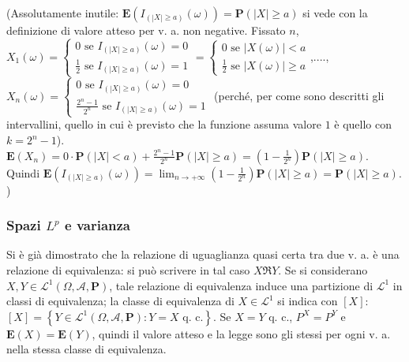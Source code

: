 \documentclass{article}
\begin{document}
(Assolutamente inutile: $\mathbf{E}\left( I_{\left( \left\vert X\right\vert
\geq a\right) }\left( \omega \right) \right) =\mathbf{P}\left( \left\vert
X\right\vert \geq a\right) $ si vede con la definizione di valore atteso per
v. a. non negative. Fissato $n$, $X_{1}\left( \omega \right) =\left\{ 
\begin{array}{c}
0\text{ se }I_{\left( \left\vert X\right\vert \geq a\right) }\left( \omega
\right) =0 \\ 
\frac{1}{2}\text{ se }I_{\left( \left\vert X\right\vert \geq a\right)
}\left( \omega \right) =1%
\end{array}%
\right. =\left\{ 
\begin{array}{c}
0\text{ se }\left\vert X\left( \omega \right) \right\vert <a \\ 
\frac{1}{2}\text{ se }\left\vert X\left( \omega \right) \right\vert \geq a%
\end{array}%
\right. $,...., $X_{n}\left( \omega \right) =\left\{ 
\begin{array}{c}
0\text{ se }I_{\left( \left\vert X\right\vert \geq a\right) }\left( \omega
\right) =0 \\ 
\frac{2^{n}-1}{2^{n}}\text{ se }I_{\left( \left\vert X\right\vert \geq
a\right) }\left( \omega \right) =1%
\end{array}%
\right. $ (perch\'{e}, per come sono descritti gli intervallini, quello in
cui \`{e} previsto che la funzione assuma valore $1$ \`{e} quello con $%
k=2^{n}-1$). $\mathbf{E}\left( X_{n}\right) =0\cdot \mathbf{P}\left(
\left\vert X\right\vert <a\right) +\frac{2^{n}-1}{2^{n}}\mathbf{P}\left(
\left\vert X\right\vert \geq a\right) =\left( 1-\frac{1}{2^{n}}\right) 
\mathbf{P}\left( \left\vert X\right\vert \geq a\right) $. Quindi $\mathbf{E}%
\left( I_{\left( \left\vert X\right\vert \geq a\right) }\left( \omega
\right) \right) =\lim_{n\rightarrow +\infty }\left( 1-\frac{1}{2^{n}}\right) 
\mathbf{P}\left( \left\vert X\right\vert \geq a\right) =\mathbf{P}\left(
\left\vert X\right\vert \geq a\right) $. )

\subsubsection{Spazi $L^{p}$ e varianza}

Si \`{e} gi\`{a} dimostrato che la relazione di uguaglianza quasi certa tra
due v. a. \`{e} una relazione di equivalenza: si pu\`{o} scrivere in tal
caso $X\mathfrak{R}Y$. Se si considerano $X,Y\in \mathcal{L}^{1}\left(
\Omega ,\mathcal{A},\mathbf{P}\right) $, tale relazione di equivalenza
induce una partizione di $\mathcal{L}^{1}$ in classi di equivalenza; la
classe di equivalenza di $X\in \mathcal{L}^{1}$ si indica con $\left[ X%
\right] $: $\left[ X\right] =\left\{ Y\in \mathcal{L}^{1}\left( \Omega ,%
\mathcal{A},\mathbf{P}\right) :Y=X\text{ q. c.}\right\} $. Se $X=Y$ q. c., $%
P^{X}=P^{Y}$ e $\mathbf{E}\left( X\right) =\mathbf{E}\left( Y\right) $,
quindi il valore atteso e la legge sono gli stessi per ogni v. a. nella
stessa classe di equivalenza.
\end{document}
